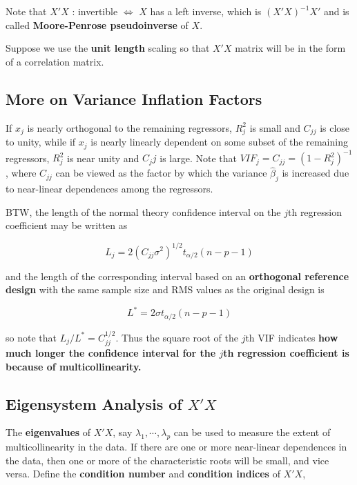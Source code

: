 \documentclass[12pt]{article}
\begin{document}
Note that $X'X$ : invertible $\Leftrightarrow$ $X$ has a left inverse, which is $(X'X)^{-1}X'$ and is called \textbf{Moore-Penrose pseudoinverse} of $X$.  


Suppose we use the \textbf{unit length} scaling so that $X'X$ matrix will be in the form of a correlation matrix.






\subsection*{More on Variance Inflation Factors}

If $x_j$ is nearly orthogonal to the remaining regressors, $R_j^2$ is small and $C_{jj}$ is close to unity, while if $x_j$ is nearly linearly dependent on some subset of the remaining regressors, $R_j^2$ is near unity and $C_jj$ is large.  Note that $VIF_j = C_{jj} = (1 -R_j^2)^{-1}$, where $C_{jj}$ can be viewed as the factor by which the variance $\hat{\beta}_j$ is increased due to near-linear dependences among the regressors. 

BTW, the length of the normal theory confidence interval on the $j$th regression coefficient may be written as 

$$
L_j = 2 (C_{jj} \sigma^2)^{1/2} t_{\alpha/2} (n-p-1)
$$

and the length of the corresponding interval based on an \textbf{orthogonal reference design} with the same sample size and RMS values as the original design is 

$$
L^\ast = 2 \sigma t_{\alpha/2} (n-p-1)
$$

so note that $L_j / L^\ast = C_{jj}^{1/2}$. Thus the square root of the $j$th VIF indicates \textbf{how much longer the confidence interval for the $j$th regression coefficient is because of multicollinearity.} 


\subsection{Eigensystem Analysis of $X'X$}

The \textbf{eigenvalues} of $X'X$, say $\lambda_1, \cdots, \lambda_p$ can be used to measure the extent of multicollinearity in the data. If there are one or more near-linear dependences in the data, then one or more of the characteristic roots will be small, and vice versa. Define the \textbf{condition number} and \textbf{condition indices} of $X'X$, 
\end{document}

